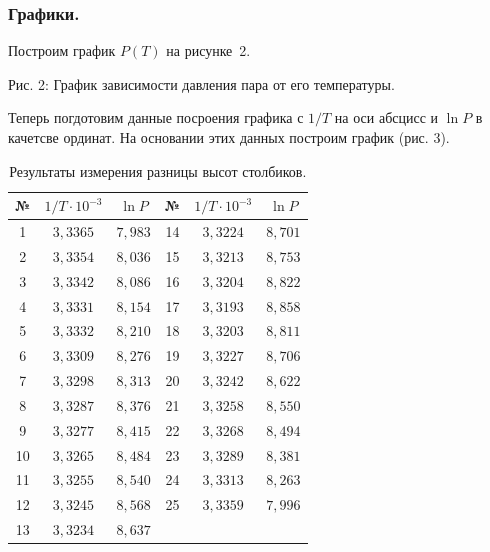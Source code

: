 \documentclass[a4paper,11pt]{article}
\begin{document}
\subsubsection{Графики.}
Построим график $P(T)$ на рисунке~2.
\begin{center}
\newline
Рис. 2: График зависимости давления пара от его температуры.\newline
\end{center}
Теперь погдотовим данные посроения графика с $1/T$ на оси абсцисс и $\ln P$ в качетсве ординат. На основании этих данных построим график (рис. 3).
\begin{table}[h!]
\centering
\begin{tabular}{ ||c|c|c||c|c|c|| }
  \hline
  №  & $1/T \cdot 10^{-3}$ & $\ln P$ & №  & $1/T \cdot 10^{-3}$ & $\ln P$ \\
  \hline
  1  & $3,3365$ & $7,983$ &           14 & $3,3224$ & $8,701$ \\
  2  & $3,3354$ & $8,036$ &           15 & $3,3213$ & $8,753$ \\
  3  & $3,3342$ & $8,086$ &           16 & $3,3204$ & $8,822$ \\
  4  & $3,3331$ & $8,154$ &           17 & $3,3193$ & $8,858$ \\
  5  & $3,3332$ & $8,210$ &           18 & $3,3203$ & $8,811$ \\
  6  & $3,3309$ & $8,276$ &           19 & $3,3227$ & $8,706$ \\
  7  & $3,3298$ & $8,313$ &           20 & $3,3242$ & $8,622$ \\
  8  & $3,3287$ & $8,376$ &           21 & $3,3258$ & $8,550$ \\
  9  & $3,3277$ & $8,415$ &           22 & $3,3268$ & $8,494$ \\
  10 & $3,3265$ & $8,484$ &           23 & $3,3289$ & $8,381$ \\
  11 & $3,3255$ & $8,540$ &           24 & $3,3313$ & $8,263$ \\
  12 & $3,3245$ & $8,568$ &           25 & $3,3359$ & $7,996$ \\
  13 & $3,3234$ & $8,637$ & & & \\

  \hline
\end{tabular}
\caption{Результаты измерения разницы высот столбиков.}
\label{table:tab2}
\end{table}
\end{document}
